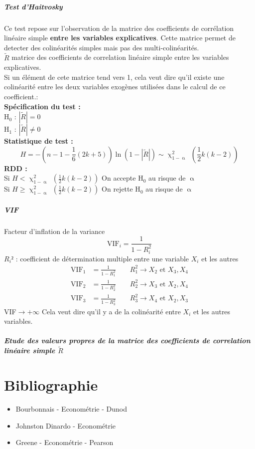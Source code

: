 \documentclass{article}
\begin{document}
\subsubsection{Test d'Haitvosky}
Ce test repose sur l'observation de la matrice des coefficients de corrélation linéaire simple
\textbf{entre les variables explicatives}. Cette matrice permet de detecter des colinéarités
simples mais pas des multi-colinéarités.\\
 $\tilde{R}$ matrice des coefficients de correlation linéaire simple entre les variables
    explicatives. \\
Si un élément de cete matrice tend vers 1, cela veut dire qu'il existe une colinéarité entre les deux variables exogènes utilisées dans le calcul de ce coefficient.: \\
\textbf{Spécification du test :} \\
H$_0$ : $|\tilde{R}| = 0$  \\
H$_1$ : $|\tilde{R}|\neq 0$ \\
\textbf{Statistique de test :}
\begin{equation*}
	H = - \left(n-1-\frac{1}{6}(2k +5)\right)\ln\left(1-|\tilde{R}|\right) \sim \upchi^2_{1-\upalpha} \; \left(\frac{1}{2}k(k-2)\right)
\end{equation*}
\textbf{RDD :}\\
Si $H< \upchi^2_{1-\upalpha} \; \left(\frac{1}{2}k(k-2)\right)$ On accepte H$_0$ au risque de $\upalpha$ \\
Si $H\ge  \upchi^2_{1-\upalpha} \; \left(\frac{1}{2}k(k-2)\right)$ On rejette H$_0$ au risque de $\upalpha$ \\

\subsubsection{VIF}
Facteur d'inflation de la variance
\begin{equation*}
    \text{VIF}_i = \frac{1}{1-R_i^2}
\end{equation*}
$R_i²$ : coefficient de détermination multiple entre une variable $X_i$ et les autres
\begin{equation*}
    \begin{split}
        \text{VIF}_1 &= \frac{1}{1-R_1^2} \qquad R_1^2 \rightarrow X_2 \text{ et } X_3,X_4 \\
        \text{VIF}_2 &= \frac{1}{1-R_2^2} \qquad R_2^2 \rightarrow X_3 \text{ et } X_2,X_4 \\
        \text{VIF}_3 &= \frac{1}{1-R_3^2} \qquad R_3^2 \rightarrow X_4 \text{ et } X_2,X_3 
    \end{split}
\end{equation*}
VIF$\rightarrow + \infty$ Cela veut dire qu'il y a de la colinéarité entre $X_i$ et les
autres variables.
\subsubsection{Etude des valeurs propres de la matrice des coefficients de correlation
linéaire simple $\tilde{R}$}
\part{Bibliographie}
\begin{itemize}
    \item Bourbonnais - Econométrie - Dunod
    \item Johnston Dinardo - Econométrie
    \item Greene - Econométrie - Pearson 
\end{itemize}
\end{document}
